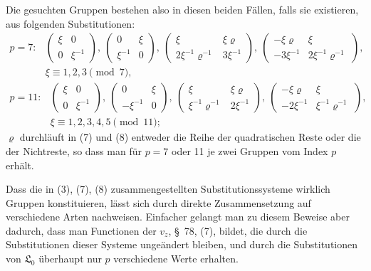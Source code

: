 \documentclass[11pt]{article}
\providecommand{\Lzero}{\mathfrak L_0}
\begin{document}
Die gesuchten Gruppen bestehen also in diesen beiden Fällen, falls sie existieren, aus folgenden Substitutionen:
\[
\begin{array}{ll}
p=7:&
\begin{pmatrix}\xi&0\\0&\xi^{-1}\end{pmatrix},\
\begin{pmatrix}0&\xi\\ \xi^{-1}&0\end{pmatrix},\
\begin{pmatrix}\xi&\xi\varrho\\2\xi^{-1}\varrho^{-1}&3\xi^{-1}\end{pmatrix},\
\begin{pmatrix}-\xi\varrho&\xi\\-3\xi^{-1}&2\xi^{-1}\varrho^{-1}\end{pmatrix},\\
&\xi\equiv1,2,3\pmod7,
\end{array}
\tag{7}
\]
\[
\begin{array}{ll}
p=11:&
\begin{pmatrix}\xi&0\\0&\xi^{-1}\end{pmatrix},\
\begin{pmatrix}0&\xi\\-\xi^{-1}&0\end{pmatrix},\
\begin{pmatrix}\xi&\xi\varrho\\\xi^{-1}\varrho^{-1}&2\xi^{-1}\end{pmatrix},\
\begin{pmatrix}-\xi\varrho&\xi\\-2\xi^{-1}&\xi^{-1}\varrho^{-1}\end{pmatrix},\\
&\xi\equiv1,2,3,4,5\pmod {11};
\end{array}
\tag{8}
\]
$\varrho$ durchläuft in (7) und (8) entweder die Reihe der quadratischen Reste oder die der Nichtreste, so dass man für $p=7$ oder 11 je zwei Gruppen vom Index $p$ erhält.

Dass die in (3), (7), (8) zusammengestellten Substitutionssysteme wirklich Gruppen konstituieren, lässt sich durch direkte Zusammensetzung auf verschiedene Arten nachweisen. Einfacher gelangt man zu diesem Beweise aber dadurch, dass man Functionen der $v_z$, \S~78, (7), bildet, die durch die Substitutionen dieser Systeme ungeändert bleiben, und durch die Substitutionen von $\Lzero$ überhaupt nur $p$ verschiedene Werte erhalten.
\end{document}
